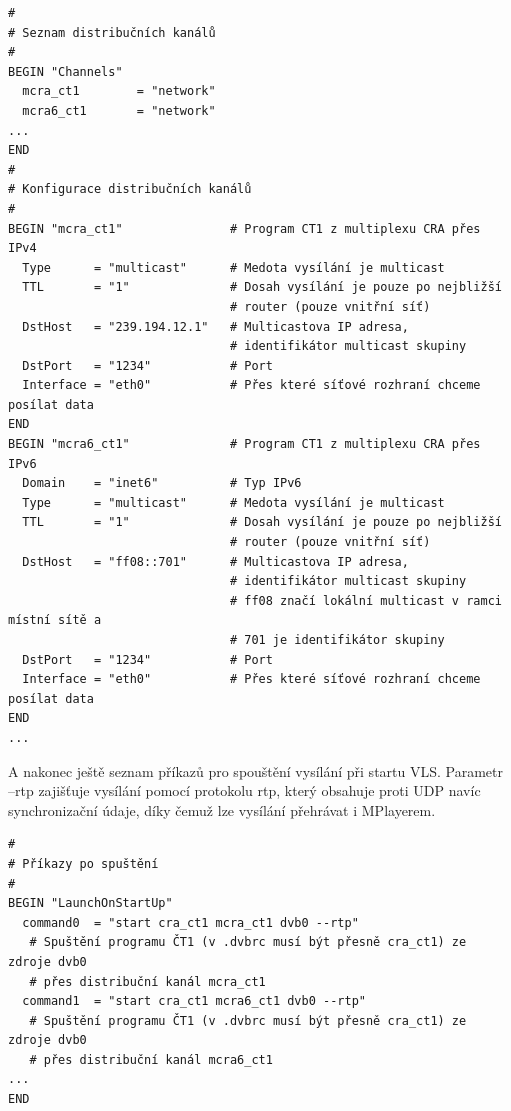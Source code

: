\begin{small}
\begin{verbatim}
#
# Seznam distribučních kanálů
#
BEGIN "Channels"
  mcra_ct1        = "network"
  mcra6_ct1       = "network"
...
END
#
# Konfigurace distribučních kanálů
#
BEGIN "mcra_ct1"               # Program CT1 z multiplexu CRA přes IPv4
  Type      = "multicast"      # Medota vysílání je multicast
  TTL       = "1"              # Dosah vysílání je pouze po nejbližší 
                               # router (pouze vnitřní síť)
  DstHost   = "239.194.12.1"   # Multicastova IP adresa, 
                               # identifikátor multicast skupiny
  DstPort   = "1234"           # Port
  Interface = "eth0"           # Přes které síťové rozhraní chceme posílat data
END
BEGIN "mcra6_ct1"              # Program CT1 z multiplexu CRA přes IPv6
  Domain    = "inet6"          # Typ IPv6
  Type      = "multicast"      # Medota vysílání je multicast
  TTL       = "1"              # Dosah vysílání je pouze po nejbližší 
                               # router (pouze vnitřní síť)
  DstHost   = "ff08::701"      # Multicastova IP adresa, 
                               # identifikátor multicast skupiny
                               # ff08 značí lokální multicast v ramci místní sítě a 
                               # 701 je identifikátor skupiny
  DstPort   = "1234"           # Port
  Interface = "eth0"           # Přes které síťové rozhraní chceme posílat data
END
...

\end{verbatim}
\end{small}

A nakonec ještě seznam příkazů pro spouštění vysílání při startu VLS. Parametr --rtp zajišťuje vysílání pomocí protokolu rtp, který obsahuje proti UDP navíc synchronizační údaje, díky čemuž lze vysílání přehrávat i MPlayerem.

\begin{small}
\begin{verbatim}
#
# Příkazy po spuštění
#
BEGIN "LaunchOnStartUp"
  command0  = "start cra_ct1 mcra_ct1 dvb0 --rtp"
   # Spuštění programu ČT1 (v .dvbrc musí být přesně cra_ct1) ze zdroje dvb0 
   # přes distribuční kanál mcra_ct1
  command1  = "start cra_ct1 mcra6_ct1 dvb0 --rtp"   
   # Spuštění programu ČT1 (v .dvbrc musí být přesně cra_ct1) ze zdroje dvb0 
   # přes distribuční kanál mcra6_ct1
...
END

\end{verbatim}
\end{small}

